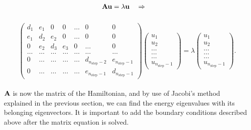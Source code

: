 \documentclass[12pt]{article}
\begin{document}
\begin{flushleft}
\vspace{5mm}
$${\bf Au}=\lambda \bf u \quad\Rightarrow\quad$$\\
\begin{equation}\label{eq:matrix_A}
\left( \begin{array}{ccccccc} d_1 & e_1 & 0   & 0    & \dots  &0     & 0 \\
                                e_1 & d_2 & e_2 & 0    & \dots  &0     &0 \\
                                0   & e_2 & d_3 & e_3  &0       &\dots & 0\\
                                \dots  & \dots & \dots & \dots  &\dots      &\dots & \dots\\
                                0   & \dots & \dots & \dots  &\dots       &d_{n_{\mathrm{step}}-2} & e_{n_{\mathrm{step}}-1}\\
                                0   & \dots & \dots & \dots  &\dots       &e_{n_{\mathrm{step}}-1} & d_{n_{\mathrm{step}}-1}

             \end{array} \right)      \left( \begin{array}{c} u_{1} \\
                                                              u_{2} \\
                                                              \dots\\ \dots\\ \dots\\
                                                              u_{n_{\mathrm{step}}-1}
             \end{array} \right)=\lambda \left( \begin{array}{c} u_{1} \\
                                                              u_{2} \\
                                                              \dots\\ \dots\\ \dots\\
                                                              u_{n_{\mathrm{step}}-1}
             \end{array} \right).
\end{equation}\\
\vspace{5mm}
$\bf A$ is now the matrix of the Hamiltonian, and by use of Jacobi's method explained in the previous section, we can find the energy eigenvalues with its belonging eigenvectors. It is important to add the boundary conditions described above after the matrix equation is solved.\\

\end{flushleft}
\end{document}
